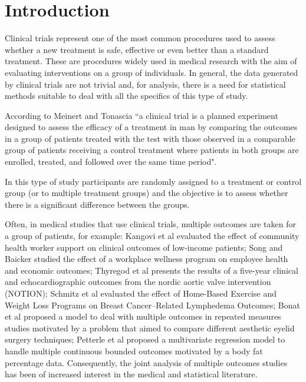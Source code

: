 \documentclass[USenglish]{article}
\theoremstyle{dgthm}
\theoremstyle{dgdef}
\begin{document}

\maketitle
	
	

\section{Introduction}\label{sec1}


Clinical trials represent one of the most common procedures used to assess whether a new treatment is safe, effective or even better than a standard treatment. These are procedures widely used in medical research with the aim of evaluating interventions on a group of individuals. In general, the data generated by clinical trials are not trivial and, for analysis, there is a need for statistical methods suitable to deal with all the specifics of this type of study.

According to Meinert and Tonascia \cite{meinert1986clinical} ``a clinical trial is a planned experiment designed to assess the efficacy of a treatment in man by comparing the outcomes in a group of patients treated with the test with those observed in a comparable group of patients receiving a control treatment where patients in both groups are enrolled, treated, and followed over the same time period".

In this type of study participants are randomly assigned to a treatment or control group (or to multiple treatment groups) \cite{hannan2008randomized} and the objective is to assess whether there is a significant difference between the groups.


Often, in medical studies that use clinical trials, multiple outcomes are taken for a group of patients, for example: Kangovi et al \cite{kangovi2018effect} evaluated the effect of community health worker support on clinical outcomes of low-income patients; Song and Baicker \cite{song2019effect} studied the effect of a workplace wellness program on employee health and economic outcomes; Thyregod et al \cite{thyregod2019five} presents the results of a five-year clinical and echocardiographic outcomes from the nordic aortic valve intervention (NOTION); Schmitz et al \cite{schmitz2019effect} evaluated the effect of Home-Based Exercise and Weight Loss Programs on Breast Cancer–Related Lymphedema Outcomes; Bonat et al \cite{plastica} proposed a model to deal with multiple outcomes in repeated measures studies motivated by a problem that aimed to compare different aesthetic eyelid surgery techniques; Petterle et al \cite{petterle2021multivariate} proposed a multivariate regression model to handle multiple continuous bounded outcomes motivated by a body fat percentage data. Consequently, the joint analysis of multiple outcomes studies has been of increased interest in the medical and statistical literature. 
\end{document}

